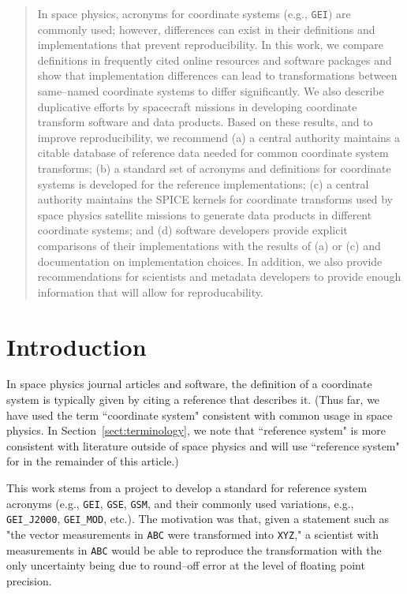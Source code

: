 \documentclass[draft]{agujournal2019}
\begin{document}
\begin{abstract}
In space physics, acronyms for coordinate systems (e.g., \texttt{GEI}) are commonly used; however, differences can exist in their definitions and implementations that prevent reproducibility. In this work, we compare definitions in frequently cited online resources and software packages and show that implementation differences can lead to transformations between same--named coordinate systems to differ significantly. We also describe duplicative efforts by spacecraft missions in developing coordinate transform software and data products. Based on these results, and to improve reproducibility, we recommend (a) a central authority maintains a citable database of reference data needed for common coordinate system transforms; (b) a standard set of acronyms and definitions for coordinate systems is developed for the reference implementations; (c) a central authority maintains the SPICE kernels for coordinate transforms used by space physics satellite missions to generate data products in different coordinate systems; and (d) software developers provide explicit comparisons of their implementations with the results of (a) or (c) and documentation on implementation choices. In addition, we also provide recommendations for scientists and metadata developers to provide enough information that will allow for reproducability. 
\end{abstract}

\section{Introduction}

In space physics journal articles and software, the definition of a coordinate system is typically given by citing a reference that describes it. (Thus far, we have used the term ``coordinate system" consistent with common usage in space physics. In Section~\ref{sect:terminology}, we note that ``reference system" is more consistent with literature outside of space physics and will use ``reference system" for in the remainder of this article.)

This work stems from a project to develop a standard for reference system acronyms (e.g., \texttt{GEI}, \texttt{GSE}, \texttt{GSM}, and their commonly used variations, e.g., \texttt{GEI\_J2000}, \texttt{GEI\_MOD}, etc.). The motivation was that, given a statement such as "the vector measurements in \texttt{ABC} were transformed into \texttt{XYZ}," a scientist with measurements in \texttt{ABC} would be able to reproduce the transformation with the only uncertainty being due to round--off error at the level of floating point precision.
\end{document}
